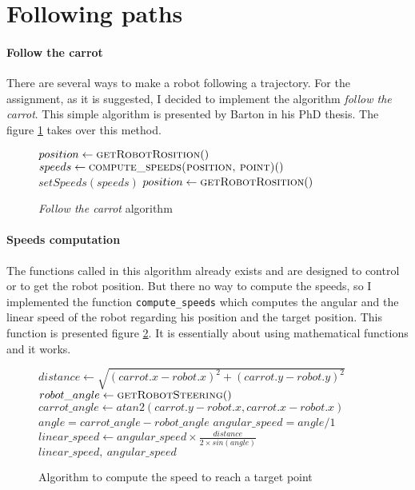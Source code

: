 
\section{Following paths}

\paragraph{Follow the carrot}{
    There are several ways to make a robot following a trajectory. For the
assignment, as it is suggested, I decided to implement the algorithm
\textit{follow the carrot}. This simple algorithm is presented by Barton in
his PhD thesis\cite{thesis:barton}. The figure \ref{algo:base} takes over
this method.
}

\begin{figure}[!h]
    \begin{algorithmic}
            \State $position \gets \Call{getRobotRosition}$
                \State $speeds \gets \Call{compute\_speeds(position, point)}$
                \State $setSpeeds( speeds )$
                \State $position \gets \Call{getRobotRosition}$
            \EndWhile
        \EndFor
    \end{algorithmic}
    
    \caption{
        \label{algo:base}
        \textit{Follow the carrot} algorithm
    }
\end{figure}

\paragraph{Speeds computation}{
    The functions called in this algorithm already exists and are designed to
control or to get the robot position. But there no way to compute the speeds, so
I implemented the function \texttt{compute\_speeds} which computes the angular 
and the linear speed of the robot regarding his position and the target position.
This function is presented figure \ref{algo:speeds}. It is essentially about
using mathematical functions and it works.
}

\begin{figure}[!h]
    \begin{algorithmic}
        \State $distance \gets \sqrt{(carrot.x - robot.x)^{2} + (carrot.y - robot.y)^{2}}$
        \State $robot\_angle \gets \Call{getRobotSteering}$
        \State $carrot\_angle \gets atan2(carrot.y - robot.x, carrot.x - robot.x)$
        \State $angle = carrot\_angle - robot\_angle$
        \State $angular\_speed = angle / 1$
        \State $linear\_speed \gets angular\_speed \times \frac{distance}{2 \times sin( angle )} $
        \State \Return $linear\_speed,~angular\_speed$
     \EndFunction
    \end{algorithmic}
    
    \caption{
        \label{algo:speeds}
        Algorithm to compute the speed to reach a target point
    }
\end{figure}

